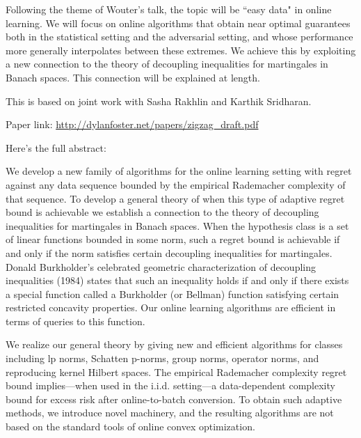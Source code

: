 \def\filepath{C:/Users/oldhe/Dropbox/Math/templates}






\pagestyle{fancy}
\chead{} 
\rhead{} 
\lfoot{} 
\cfoot{\thepage} 
\rfoot{} 
\renewcommand{\headrulewidth}{.3pt} 
\setlength\voffset{0in}
\setlength\textheight{648pt}





Following the theme of Wouter's talk, the topic will be ``easy data" in online learning. We will focus on online algorithms that obtain near optimal guarantees both in the statistical setting and the adversarial setting, and whose performance more generally interpolates between these extremes. We achieve this  by exploiting a new connection to the theory of decoupling inequalities for martingales in Banach spaces. This connection will be explained at length.

This is based on joint work with Sasha Rakhlin and Karthik Sridharan.

Paper link: \url{http://dylanfoster.net/papers/zigzag_draft.pdf}

Here's the full abstract:

We develop a new family of algorithms for the online learning setting with regret against any data sequence bounded by the empirical Rademacher complexity of that sequence. To develop a general theory of when this type of adaptive regret bound is achievable we establish a connection to the theory of decoupling inequalities for martingales in Banach spaces. When the hypothesis class is a set of linear functions bounded in some norm, such a regret bound is achievable if and only if the norm satisfies certain decoupling inequalities for martingales. Donald Burkholder’s celebrated geometric characterization of decoupling inequalities (1984) states that such an inequality holds if and only if there exists a special function called a Burkholder (or Bellman) function satisfying certain restricted concavity properties. Our online learning algorithms are efficient in terms of queries to this function.

We realize our general theory by giving new and efficient algorithms for classes including lp norms, Schatten p-norms, group norms, operator norms, and reproducing kernel Hilbert spaces. The empirical Rademacher complexity regret bound implies---when used in the i.i.d. setting---a data-dependent complexity bound for excess risk after online-to-batch conversion. To obtain such adaptive methods, we introduce novel machinery, and the resulting algorithms are not based on the standard tools of online convex optimization. 


